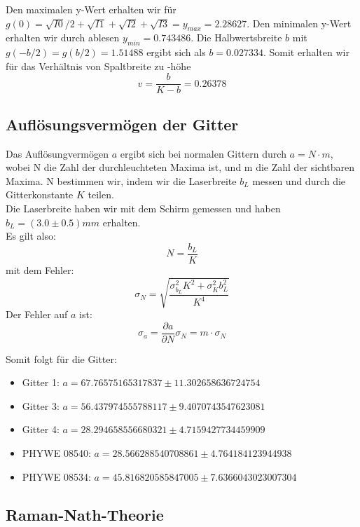 Den maximalen y-Wert erhalten wir für $g\left( 0 \right) = \sqrt{I0}/2+\sqrt{I1}+\sqrt{I2}+\sqrt{I3} = y_{max} = 2.28627 $. Den minimalen y-Wert erhalten wir durch ablesen $ y_{min} = 0.743486 $. Die Halbwertsbreite $b$ mit $ g\left( - b/2 \right) = g \left( b/2 \right) = 1.51488 $ ergibt sich als $ b = 0.027334 $. Somit erhalten wir für das Verhältnis von Spaltbreite zu -höhe
$$ v = \frac{b}{K-b} = 0.26378 $$ %

\subsection{Aufl\"osungsverm\"ogen der Gitter}

Das Aufl\"osungverm\"ogen $a$ ergibt sich bei normalen Gittern durch $a=N\cdot m$, wobei N die Zahl der durchleuchteten Maxima ist, und m die Zahl der sichtbaren Maxima. N bestimmen wir, indem wir die Laserbreite $b_L$ messen und durch die Gitterkonstante $K$ teilen.\\
Die Laserbreite haben wir mit dem Schirm gemessen und haben $b_L = (3.0 \pm 0.5) mm$ erhalten.\\
Es gilt also: $$N = \frac{b_L}{K}$$
mit dem Fehler: $$\sigma_N = \sqrt{\frac{\sigma_{b_L}^2K^2 + \sigma_K^2b_L^2}{K^4}}$$
Der Fehler auf $a$ ist: $$\sigma_a = \frac{\partial a}{\partial N}\sigma_N = m\cdot \sigma_N$$

Somit folgt f\"ur die Gitter:

\begin{itemize}
\item Gitter 1: $ a = 67.76575165317837 \pm 11.302658636724754 $
\item Gitter 3: $ a = 56.437974555788117 \pm 9.4070743547623081 $
\item Gitter 4: $ a = 28.294658556680321 \pm 4.7159427734459909 $
\item PHYWE 08540: $ a = 28.566288540708861 \pm 4.764184123944938 $
\item PHYWE 08534: $ a = 45.816820585847005 \pm 7.6366043023007304 $
\end{itemize}


\subsection{Raman-Nath-Theorie}


